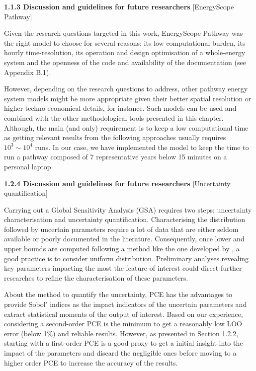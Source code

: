 \documentclass[12pt,a4paper]{article}
\begin{document}
\begin{mdframed}[style=manuscript]
\textbf{1.1.3 Discussion and guidelines for future researchers} [EnergyScope Pathway]

Given the research questions targeted in this work, EnergyScope Pathway was the right model to choose for several reasons: its low computational burden, its hourly time-resolution, its operation and design optimisation of a whole-energy system and the openness of the code and availability of the documentation (see Appendix B.1). 

However, depending on the research questions to address, other pathway energy system models might be more appropriate given their better spatial resolution or higher techno-economical details, for instance. Such models can be used and combined with the other methodological tools presented in this chapter. Although, the main (and only) requirement is to keep a low computational time as getting relevant results from the following approaches usually requires $10^3\sim 10^4$ runs.  In our case, we have implemented the model to keep the time to run a pathway composed of 7 representative years below 15 minutes on a personal laptop.
\end{mdframed}

\begin{mdframed}[style=manuscript]
\textbf{1.2.4 Discussion and guidelines for future researchers} [Uncertainty quantification]

Carrying out a Global Sensitivity Analysis (GSA) requires two steps: uncertainty characterisation and uncertainty quantification. Characterising the distribution followed by uncertain parameters require a lot of data that are either seldom available or poorly documented in the literature. Consequently, once lower and upper bounds are computed following a method like the one developed by \citet{Moret2017}, a good practice is to consider uniform distribution. Preliminary analyses revealing key parameters impacting the most the feature of interest could direct further researches to refine the characterisation of these parameters.

About the method to quantify the uncertainty, PCE has the advantages to provide Sobol' indices as the impact indicators of the uncertain parameters and extract statistical moments of the output of interest. Based on our experience, considering a second-order PCE is the minimum to get a reasonably low LOO error (below 1\%) and reliable results. However, as presented in Section 1.2.2, starting with a first-order PCE is a good proxy to get a initial insight into the impact of the parameters and discard the negligible ones before moving to a higher order PCE to increase the accuracy of the results.
\end{mdframed}
\end{document}
